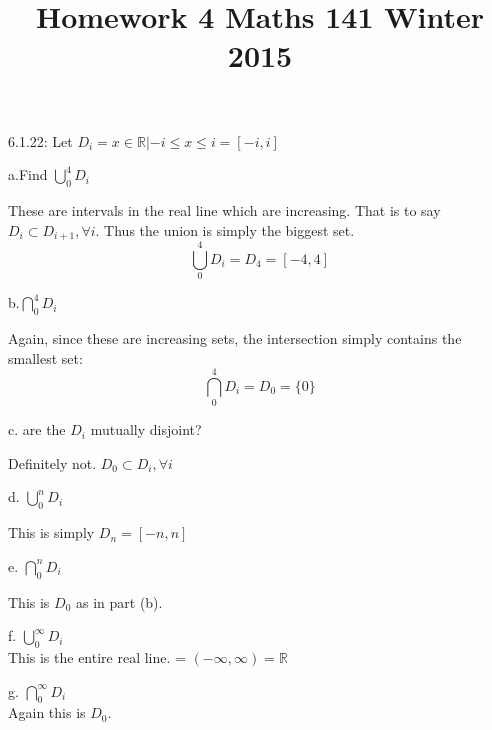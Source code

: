 \documentclass[16 pt]{amsart}
\theoremstyle{definition}
\theoremstyle{remark}
\numberwithin{equation}{section}
\newcommand{\R}{\mathbb{R}}
\begin{document}
\title{Homework 4 Maths 141 Winter 2015}
\maketitle 


6.1.22: Let $D_i = {x\in\R | -i\leq x \leq i} = [-i,i]$

a.Find $\bigcup_{0}^{4}D_i$

\vspace{.5in}

These are intervals in the real line which are increasing.  That is to say $D_i \subset D_{i+1}, \forall i$.  Thus the union is simply the biggest set.
\[
\bigcup_{0}^{4}D_i = D_4 = [-4,4]
\]

\vspace{.5in}

b.$\bigcap_{0}^{4}D_i$

\vspace{.5in}

Again, since these are increasing sets, the intersection simply contains the smallest set:
\[
\bigcap_{0}^{4}D_i = D_0 = \{0\}
\]

\vspace{.5in}

c. are the $D_i$ mutually disjoint?

\vspace{.5in}

Definitely not.  $D_0 \subset D_i, \forall i$

\vspace{.5in}

d. $\bigcup_{0}^{n}D_i$

\vspace{.5in}

This is simply $D_n = [-n,n]$

\vspace{.5in}

e. $\bigcap_{0}^{n}D_i$

\vspace{.5in}

This is $D_0$ as in part (b).

\vspace{.5in}

f. $\bigcup_{0}^{\infty}D_i$\\
This is the entire real line. = $(-\infty,\infty)=\R$

g. $\bigcap_{0}^{\infty}D_i$\\
Again this is $D_0$.

\newpage
\end{document}
